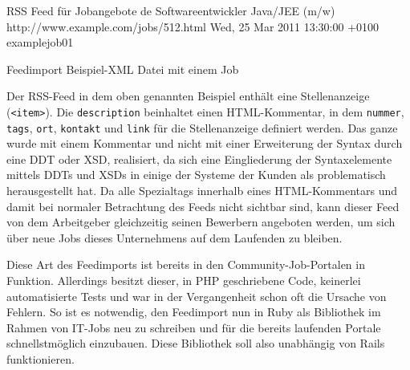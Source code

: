 \begin{ruby}[label=beispiel\_job.xml, fontsize=\relsize{-2}]
 
    RSS Feed für Jobangebote 
    de
      Softwareentwickler Java/JEE (m/w)
        \PY{c+cp}{<![CDATA[}
\PY{c+cp}{        ]]>}
      http://www.example.com/jobs/512.html
      Wed, 25 Mar 2011 13:30:00 +0100
      example\PYZus{}job\PYZus{}01
\end{ruby}
\captionsetup{type=lstlisting}
\caption{Feedimport Beispiel-XML Datei mit einem Job}
Der RSS-Feed in dem oben genannten Beispiel enthält eine Stellenanzeige (\verb|<item>|). Die \verb|description| beinhaltet einen HTML-Kommentar, in dem \verb|nummer|, \verb|tags|, \verb|ort|, \verb|kontakt| und \verb|link| für die Stellenanzeige definiert werden. Das ganze wurde mit einem Kommentar und nicht mit einer Erweiterung der Syntax durch eine DDT oder XSD, realisiert, da sich eine Eingliederung der Syntaxelemente mittels DDTs und XSDs in einige der Systeme der Kunden als problematisch herausgestellt hat. Da alle Spezialtags innerhalb eines HTML-Kommentars und damit bei normaler Betrachtung des Feeds nicht sichtbar sind, kann dieser Feed von dem Arbeitgeber gleichzeitig seinen Bewerbern angeboten werden, um sich über neue Jobs dieses Unternehmens auf dem Laufenden zu bleiben.

Diese Art des Feedimports ist bereits in den Community-Job-Portalen in Funktion. Allerdings besitzt dieser, in PHP geschriebene Code, keinerlei automatisierte Tests und war in der Vergangenheit schon oft die Ursache von Fehlern. So ist es notwendig, den Feedimport nun in Ruby als Bibliothek im Rahmen von IT-Jobs neu zu schreiben und für die bereits laufenden Portale schnellstmöglich einzubauen.
Diese Bibliothek soll also unabhängig von Rails funktionieren.


